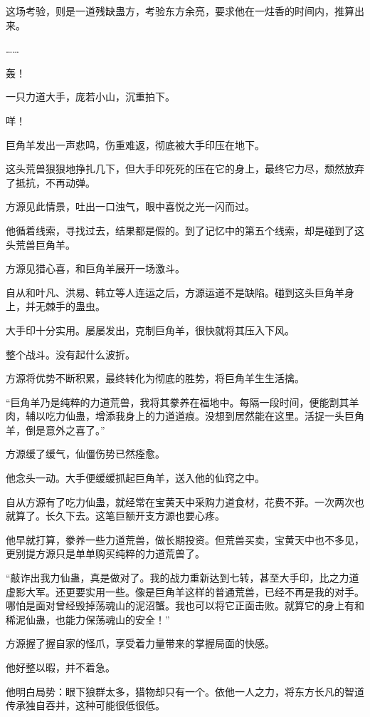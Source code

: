 \begin{this_body}
这场考验，则是一道残缺蛊方，考验东方余亮，要求他在一炷香的时间内，推算出来。

……

轰！

一只力道大手，庞若小山，沉重拍下。

咩！

巨角羊发出一声悲鸣，伤重难返，彻底被大手印压在地下。

这头荒兽狠狠地挣扎几下，但大手印死死的压在它的身上，最终它力尽，颓然放弃了抵抗，不再动弹。

方源见此情景，吐出一口浊气，眼中喜悦之光一闪而过。

他循着线索，寻找过去，结果都是假的。到了记忆中的第五个线索，却是碰到了这头荒兽巨角羊。

方源见猎心喜，和巨角羊展开一场激斗。

自从和叶凡、洪易、韩立等人连运之后，方源运道不是缺陷。碰到这头巨角羊身上，并无棘手的蛊虫。

大手印十分实用。屡屡发出，克制巨角羊，很快就将其压入下风。

整个战斗。没有起什么波折。

方源将优势不断积累，最终转化为彻底的胜势，将巨角羊生生活擒。

“巨角羊乃是纯粹的力道荒兽，我将其豢养在福地中。每隔一段时间，便能割其羊肉，辅以吃力仙蛊，增添我身上的力道道痕。没想到居然能在这里。活捉一头巨角羊，倒是意外之喜了。”

方源缓了缓气，仙僵伤势已然痊愈。

他念头一动。大手便缓缓抓起巨角羊，送入他的仙窍之中。

自从方源有了吃力仙蛊，就经常在宝黄天中采购力道食材，花费不菲。一次两次也就算了。长久下去。这笔巨额开支方源也要心疼。

他早就打算，豢养一些力道荒兽，做长期投资。但荒兽买卖，宝黄天中也不多见，更别提方源只是单单购买纯粹的力道荒兽了。

“敲诈出我力仙蛊，真是做对了。我的战力重新达到七转，甚至大手印，比之力道虚影大军。还更要实用一些。像是巨角羊这样的普通荒兽，已经不再是我的对手。哪怕是面对曾经毁掉荡魂山的泥沼蟹。我也可以将它正面击败。就算它的身上有和稀泥仙蛊，也能力保荡魂山的安全！”

方源握了握自家的怪爪，享受着力量带来的掌握局面的快感。

他好整以暇，并不着急。

他明白局势：眼下狼群太多，猎物却只有一个。依他一人之力，将东方长凡的智道传承独自吞并，这种可能很低很低。


\end{this_body}
